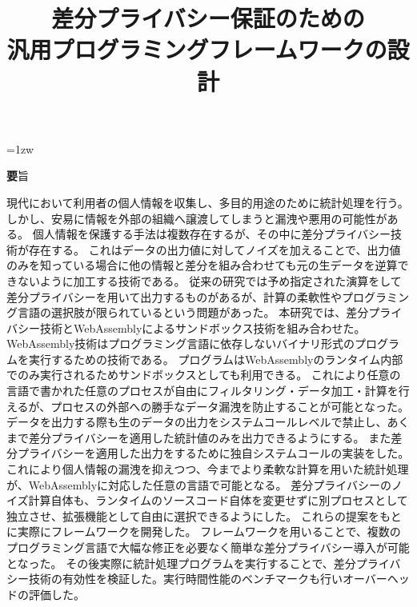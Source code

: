 \documentclass[a4paper,11pt]{jreport}
\title{差分プライバシー保証のための \\ 汎用プログラミングフレームワークの設計}
\author{}
\begin{document}
\maketitle
\thispagestyle{empty}
\newpage

\thispagestyle{empty}
\vspace*{20pt plus 1fil}
\parindent=1zw
\noindent
\begin{center}
{\Large \textbf 要旨}
\vspace{2cm}
\end{center}
現代において利用者の個人情報を収集し、多目的用途のために統計処理を行う。
しかし、安易に情報を外部の組織へ譲渡してしまうと漏洩や悪用の可能性がある。
個人情報を保護する手法は複数存在するが、その中に差分プライバシー技術が存在する。
これはデータの出力値に対してノイズを加えることで、出力値のみを知っている場合に他の情報と差分を組み合わせても元の生データを逆算できないように加工する技術である。
従来の研究では予め指定された演算をして差分プライバシーを用いて出力するものがあるが、計算の柔軟性やプログラミング言語の選択肢が限られているという問題があった。
本研究では、差分プライバシー技術とWebAssemblyによるサンドボックス技術を組み合わせた。
WebAssembly技術はプログラミング言語に依存しないバイナリ形式のプログラムを実行するための技術である。
プログラムはWebAssemblyのランタイム内部でのみ実行されるためサンドボックスとしても利用できる。
これにより任意の言語で書かれた任意のプロセスが自由にフィルタリング・データ加工・計算を行えるが、プロセスの外部への勝手なデータ漏洩を防止することが可能となった。
データを出力する際も生のデータの出力をシステムコールレベルで禁止し、あくまで差分プライバシーを適用した統計値のみを出力できるようにする。
また差分プライバシーを適用した出力をするために独自システムコールの実装をした。
これにより個人情報の漏洩を抑えつつ、今までより柔軟な計算を用いた統計処理が、WebAssemblyに対応した任意の言語で可能となる。
差分プライバシーのノイズ計算自体も、ランタイムのソースコード自体を変更せずに別プロセスとして独立させ、拡張機能として自由に選択できるようにした。
これらの提案をもとに実際にフレームワークを開発した。
フレームワークを用いることで、複数のプログラミング言語で大幅な修正を必要なく簡単な差分プライバシー導入が可能となった。
その後実際に統計処理プログラムを実行することで、差分プライバシー技術の有効性を検証した。実行時間性能のベンチマークも行いオーバーヘッドの評価した。

\par
\vspace{0pt plus 1fil}
\newpage

\tableofcontents
\listoffigures
\end{document}
